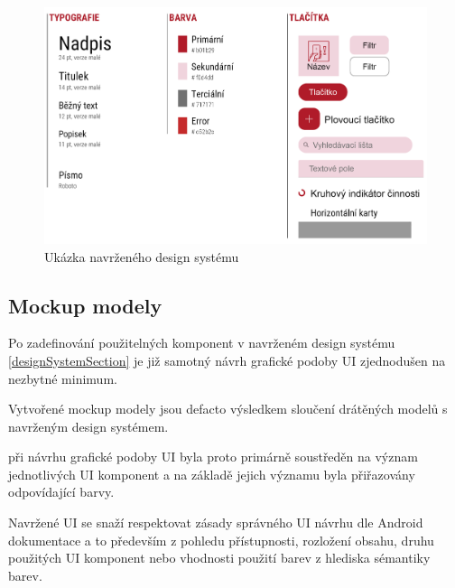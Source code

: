 \begin{figure}[H]
  \centering
  \includegraphics[width=.99\textwidth]{design_system.png}
  \caption{Ukázka navrženého design systému}
  \label{fig:design_system}
\end{figure}

\subsection{Mockup modely} \label{navrhMockupModelu}
Po zadefinování použitelných komponent v navrženém design systému \ref{designSystemSection} je již samotný návrh grafické podoby UI zjednodušen 
na nezbytné minimum. 

Vytvořené mockup modely jsou defacto výsledkem sloučení drátěných modelů s navrženým design systémem.

při návrhu grafické podoby UI byla proto primárně soustředěn na význam jednotlivých UI komponent a na základě jejich významu byla
přiřazovány odpovídající barvy. 

Navržené UI se snaží respektovat zásady správného UI návrhu dle Android dokumentace a to především z pohledu přístupnosti, rozložení obsahu, 
druhu použitých UI komponent nebo vhodnosti použití barev z hlediska sémantiky barev.

